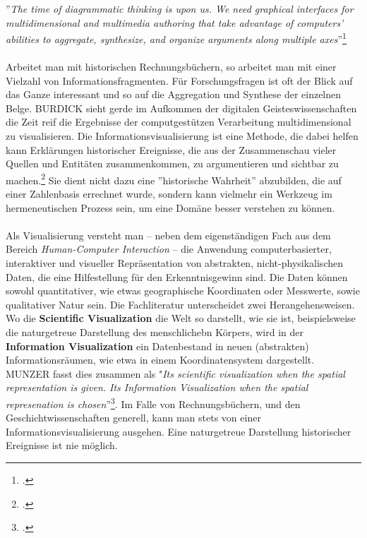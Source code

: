 \documentclass[12pt,a4paper]{article}
\begin{document}
''\textit{The time of diagrammatic thinking is upon us. We need graphical interfaces for multidimensional and multimedia authoring that take advantage of computers’ abilities to aggregate, synthesize, and organize arguments along multiple axes}''\footcite[][S.119]{burdick2012digital_humanities}
\\
\\
Arbeitet man mit historischen Rechnungsbüchern, so arbeitet man mit einer Vielzahl von Informationsfragmenten. Für Forschungsfragen ist oft der Blick auf das Ganze interessant und so auf die Aggregation und Synthese der einzelnen Belge. BURDICK sieht gerde im Aufkommen der digitalen Geisteswissenschaften die Zeit reif die Ergebnisse der computgestützen Verarbeitung multidimensional zu visualisieren. Die Informationsvisualisierung ist eine Methode, die dabei helfen kann Erklärungen historischer Ereignisse, die aus der Zusammenschau vieler Quellen und Entitäten zusammenkommen, zu argumentieren und sichtbar zu machen.\footcite[][S.3-5]{frank2018visualisierungswerkzeuge} Sie dient nicht dazu eine ''historische Wahrheit'' abzubilden, die auf einer Zahlenbasis errechnet wurde, sondern kann vielmehr ein Werkzeug im hermeneutischen Prozess sein, um eine Domäne besser verstehen zu können.
\\
\\
Als Visualisierung versteht man -- neben dem eigenständigen Fach aus dem Bereich \textit{Human-Computer Interaction} -- die Anwendung computerbasierter, interaktiver und visueller Repräsentation von abstrakten, nicht-physikalischen Daten, die eine Hilfestellung für den Erkenntnisgewinn sind. Die Daten können sowohl quantitativer, wie etwas geographische Koordinaten oder Messwerte, sowie qualitativer Natur sein. Die Fachliteratur unterscheidet zwei Herangehensweisen. Wo die \textbf{Scientific Visualization} die Welt so darstellt, wie sie ist, beispielsweise die naturgetreue Darstellung des menschlichebn Körpers, wird in der \textbf{Information Visualization} ein Datenbestand in neuen (abstrakten) Informationsräumen, wie etwa in einem Koordinatensystem dargestellt. MUNZER fasst dies zusammen als "\textit{Its scientific visualization when the spatial representation is given. Its Information Visualization when the spatial represenation is chosen}''\footcite[][S.134-153)]{munzner2008process}. Im Falle von Rechnungsbüchern, und den Geschichtwissenschaften generell, kann man stets von einer Informationsvisualisierung ausgehen. Eine naturgetreue Darstellung historischer Ereignisse ist nie möglich.
\end{document}
